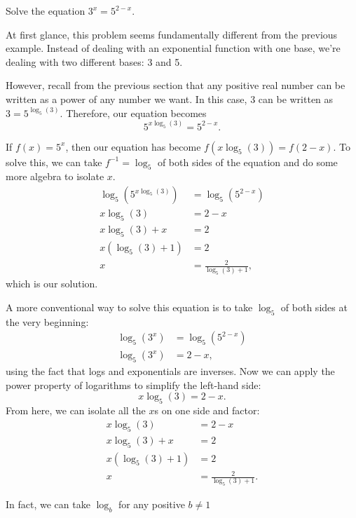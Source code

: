 \documentclass[nooutcomes]{ximera}
\begin{document}
\begin{example}
Solve the equation $3^x = 5^{2 - x}$. 
\end{example}

\begin{explanation}
At first glance, this problem seems fundamentally different from the previous example. Instead of dealing with an exponential function with one base, we're dealing with two different bases: 3 and 5. 

However, recall from the previous section that any positive real number can be written as a power of any number we want. In this case, 3 can be written as $3 = 5^{\log_5(3)}$. Therefore, our equation becomes
$$
5^{x\log_5(3)} = 5^{2 - x}.
$$

If $f(x) = 5^x$, then our equation has become $f(x \log_5(3)) = f(2 - x)$. To solve this, we can take $f^{-1} = \log_5$ of both sides of the equation and do some more algebra to isolate $x$. 
\begin{align*}
\log_5(5^{x \log_5(3)}) & = \log_5(5^{2 -x }) \\
x\log_5(3) & = 2 - x \\
x\log_5(3) + x & = 2 \\
x(\log_5(3) + 1) & = 2 \\
x & = \frac{2}{\log_5(3) + 1},
\end{align*}
which is our solution.

A more conventional way to solve this equation is to take $\log_5$ of both sides at the very beginning:
\begin{align*}
\log_5(3^x) & = \log_5(5^{2 - x}) \\
\log_5(3^x) & = 2 - x,
\end{align*}
using the fact that logs and exponentials are inverses. Now we can apply the power property of logarithms to simplify the left-hand side:
$$
x\log_5(3) = 2 - x.
$$
From here, we can isolate all the $x$s on one side and factor:
\begin{align*}
x\log_5(3) & = 2 - x \\
x\log_5(3) + x & = 2 \\
x(\log_5(3) + 1) & = 2 \\
x & = \frac{2}{\log_5(3) + 1}.
\end{align*}

\end{explanation}

\begin{callout}
In fact, we can take $\log_b$ for any positive $b \ne 1$
\end{callout}
\end{document}
